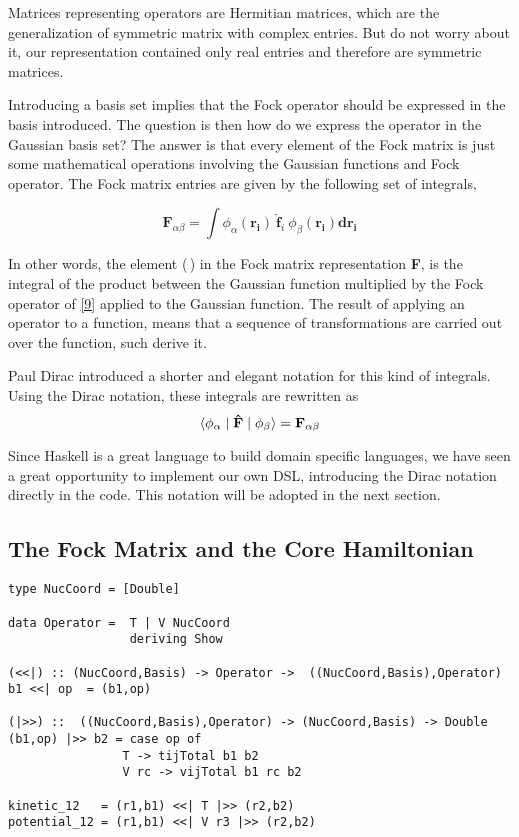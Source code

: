 \documentclass{tmr}
\begin{document}
\par Matrices representing operators are Hermitian matrices, which are the generalization
of symmetric matrix with complex entries. But do not worry about it, our representation
contained only real entries and therefore are symmetric matrices.

Introducing a basis set implies that the Fock operator should be expressed in the 
basis introduced. The question is then how do we express the operator in the Gaussian basis set?
The answer is that every element of the Fock matrix is just some mathematical operations
involving the Gaussian functions and Fock operator. The Fock matrix entries are given 
by the following set of integrals,

\[\mathbf{F}_{\alpha \beta} =\int{\phi_{\alpha}(\mathbf{r_{i}})\: \mathbf{\hat f}_{i}\: \phi_{\beta}(\mathbf{r_{i}}) \mathbf{dr_{i}}} \]

In other words, the element (\textalpha\,\textbeta) in the Fock matrix representation \textbf{F}, is
the integral of the product between the \textalpha Gaussian function multiplied by the Fock operator
of \eqref{9} applied to the \textbeta Gaussian function. The result of applying an operator to 
a function, means that a sequence of transformations are carried out over the function, such derive it.

Paul Dirac introduced a shorter and elegant notation for 
this kind of integrals. Using the Dirac notation, these integrals are rewritten as
\begin{equation}\label{14}
 \braket{\phi_{\alpha} \mid \mathbf{\hat F} \mid  \phi_{\beta}}  = \mathbf{F}_{\alpha \beta} 
\end{equation}

Since Haskell is a great language to build domain specific languages, we have seen 
a great opportunity to implement our own DSL, introducing the Dirac notation directly in the code.
This notation will be adopted in the next section.


\subsection{The Fock Matrix and the Core Hamiltonian}
\begin{lstlisting}[float,captionpos=b,belowcaptionskip=4pt, caption= Operators definition]
type NucCoord = [Double]

data Operator =  T | V NucCoord
                 deriving Show

(<<|) :: (NucCoord,Basis) -> Operator ->  ((NucCoord,Basis),Operator)
b1 <<| op  = (b1,op)

(|>>) ::  ((NucCoord,Basis),Operator) -> (NucCoord,Basis) -> Double
(b1,op) |>> b2 = case op of
                T -> tijTotal b1 b2
                V rc -> vijTotal b1 rc b2

kinetic_12   = (r1,b1) <<| T |>> (r2,b2)
potential_12 = (r1,b1) <<| V r3 |>> (r2,b2)
\end{lstlisting}
\end{document}
